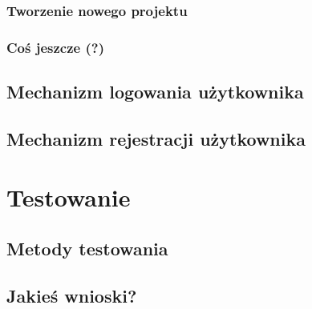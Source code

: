 \documentclass[a4paper, 12pt, oneside]{article}
\begin{document}
			\subsubsection{Tworzenie nowego projektu}
			\subsubsection{Coś jeszcze (?)}
	\subsection{Mechanizm logowania użytkownika}
	\subsection{Mechanizm rejestracji użytkownika}
\section{Testowanie}
	\subsection{Metody testowania}
	\subsection{Jakieś wnioski?}
\end{document}
